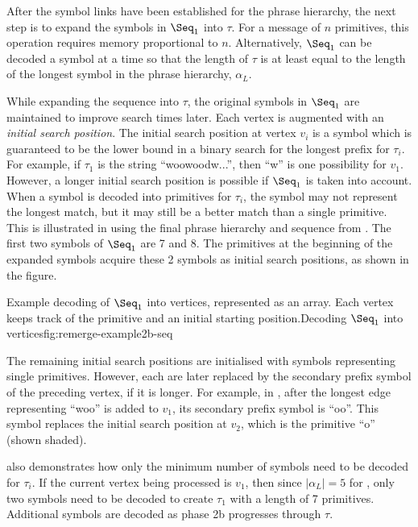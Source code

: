 
After the symbol links have been established for the phrase 
hierarchy, the next step is to expand the symbols in $\Seq_1$ 
into $\tau$.  For a message of $n$ primitives, this operation
requires memory proportional to $n$.  Alternatively,
$\Seq_1$ can be decoded a symbol at a time so that the length of
$\tau$ is at least equal to the length of
the longest symbol in the phrase hierarchy, $\alpha_L$.

While expanding the sequence into $\tau$, the original symbols 
in $\Seq_1$ are maintained to improve search times later.  
Each vertex is augmented
with an {\emph {initial search position}}.  The initial
search position at vertex $v_i$ 
is a symbol which is guaranteed to be the lower bound in a binary search 
for the longest prefix for $\tau_i$.  For example, if $\tau_1$ is
the string ``woowoodw...'', then ``w'' is one possibility 
for $v_1$.  However, a longer initial search
position is possible if $\Seq_1$ is taken into account.  
When a symbol is decoded into primitives for $\tau_i$, 
the symbol may not represent the longest
match, but it may still be a better match than a single
primitive.  This is illustrated in 
 using the final phrase 
hierarchy and sequence from .  The first two
symbols of $\Seq_1$ are
7 and 8.  The primitives at the beginning of the expanded
symbols acquire these 2 symbols as initial search
positions, as shown in the figure.

\fig{}
{Example decoding of $\Seq_1$ into vertices, represented
as an array.  Each vertex keeps track of the primitive and an
initial starting position.}{Decoding $\Seq_1$
into vertices}{fig:remerge-example2b-seq}

The remaining initial search positions are initialised with
symbols representing single primitives.  However, each are
later replaced by the secondary prefix symbol of the 
preceding vertex, if it is longer.
For example, in , after
the longest edge representing ``woo'' is added to $v_1$,
its secondary prefix symbol is ``oo''.  This symbol replaces
the initial search position at $v_2$, which is the primitive
``o'' (shown shaded).

 also demonstrates how
only the minimum number of
symbols need to be decoded for $\tau_i$.  If the
current vertex being processed is $v_1$, then since $|\alpha_L| = 5$
for , only two symbols need to
be decoded to create $\tau_1$ with a length of 7 primitives.
Additional symbols are decoded as phase 2b progresses through
$\tau$.

